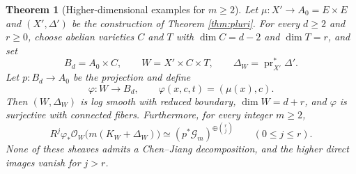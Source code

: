 \documentclass[11pt,letterpaper]{article}
\theoremstyle{paper}
\newtheorem{theorem}{Theorem}[section]
\newcommand{\OO}{\mathcal O}
\newcommand{\GG}{\mathcal G}
\DeclareMathOperator{\pr}{pr}
\begin{document}
\begin{theorem}[Higher-dimensional examples for $m\ge2$]\label{thm:pluriproduct}
Let $\mu:X'\to A_0=E\times E$ and $(X',\Delta')$ be the construction of Theorem \ref{thm:pluri}. For every $d\ge2$ and $r\ge0$, choose abelian varieties $C$ and $T$ with $\dim C=d-2$ and $\dim T=r$, and set
\[
B_d=A_0\times C,\qquad W=X'\times C\times T,\qquad\Delta_W=\pr_{X'}^*\Delta'.
\]
Let $p:B_d\to A_0$ be the projection and define
\[
\varphi:W\longrightarrow B_d,\qquad\varphi(x,c,t)=(\mu(x),c).
\]
Then $(W,\Delta_W)$ is log smooth with reduced boundary, $\dim W=d+r$, and $\varphi$ is surjective with connected fibers. Furthermore, for every integer $m\ge2$,
\[
R^j\varphi_*\OO_W\bigl(m(K_W+\Delta_W)\bigr)
\simeq(p^*\GG_m)^{\oplus\binom rj}\qquad(0\le j\le r).
\]
None of these sheaves admits a Chen--Jiang decomposition, and the higher direct images vanish for $j>r$.
\end{theorem}
\end{document}
